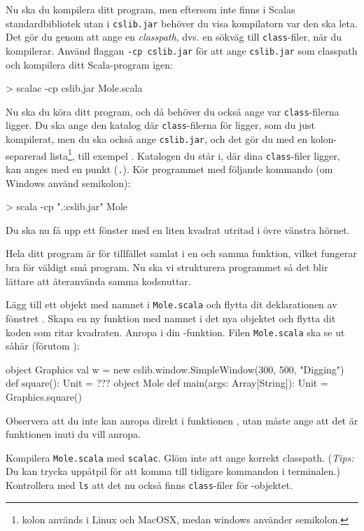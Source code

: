 \Subtask
Nu ska du kompilera ditt program, men eftersom  inte finns i Scalas standardbibliotek utan i \texttt{cslib.jar} behöver du visa kompilatorn var den ska leta.
Det gör du genom att ange en \emph{classpath}, dvs. en sökväg till \texttt{class}-filer, när du kompilerar.
Använd flaggan \texttt{-cp cslib.jar} för att ange \texttt{cslib.jar} som classpath och kompilera ditt Scala-program igen:
\begin{REPLnonum}
> scalac -cp cslib.jar Mole.scala
\end{REPLnonum}

\Subtask
Nu ska du köra ditt program, och då behöver du också ange var \texttt{class}-filerna ligger.
Du ska ange den katalog där \texttt{class}-filerna för  ligger, som du just kompilerat, men du ska också ange \texttt{cslib.jar}, och det gör du med en kolon-separerad lista\footnote{kolon används i Linux och MacOSX, medan windows använder semikolon.}, till exempel .
Katalogen du står i, där dina \texttt{class}-filer ligger, kan anges med en punkt (\texttt{.}).
Kör programmet med följande kommando (om Windows använd semikolon):
\begin{REPLnonum}
> scala -cp ".:cslib.jar" Mole
\end{REPLnonum}
Du ska nu få upp ett fönster med en liten kvadrat utritad i övre vänstra hörnet.


\Task
Hela ditt program är för tillfället samlat i en och samma funktion, vilket fungerar bra för väldigt små program.
Nu ska vi strukturera programmet så det blir lättare att återanvända samma kodsnuttar.

\Subtask
Lägg till ett objekt med namnet  i \texttt{Mole.scala} och flytta dit deklarationen av fönstret .
Skapa en ny funktion med namnet  i det nya objektet och flytta dit koden som ritar kvadraten.
Anropa  i din -funktion.
Filen \texttt{Mole.scala} ska se ut såhär (förutom ):
\begin{Code}
object Graphics {
	val w = new cslib.window.SimpleWindow(300, 500, "Digging")
	def square(): Unit = ???
}
object Mole {
	def main(args: Array[String]): Unit = {
		Graphics.square()
	}
}
\end{Code}
Observera att du inte kan anropa  direkt i funktionen , utan måste ange att det är  funktionen inuti  du vill anropa.

\Subtask
Kompilera \texttt{Mole.scala} med \texttt{scalac}.
Glöm inte att ange korrekt classpath.
(\emph{Tips:} Du kan trycka uppåtpil för att komma till tidigare kommandon i terminalen.)
Kontrollera med \texttt{ls} att det nu också finns \texttt{class}-filer för -objektet.

